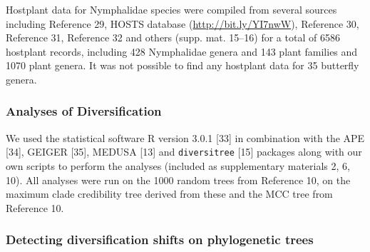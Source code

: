 \documentclass[10pt]{article}
\begin{document}
Hostplant data for Nymphalidae species were compiled from several
sources including Reference 29, HOSTS database
(\url{http://bit.ly/YI7nwW}), Reference 30, Reference 31, Reference 32
and others (supp. mat. 15--16) for a total of 6586 hostplant records,
including 428 Nymphalidae genera and 143 plant families and 1070 plant
genera. It was not possible to find any hostplant data for 35 butterfly
genera.

\subsubsection{Analyses of
Diversification}\label{analyses-of-diversification}

We used the statistical software R version 3.0.1 {[}33{]} in combination
with the APE {[}34{]}, GEIGER {[}35{]}, MEDUSA {[}13{]} and
\texttt{diversitree} {[}15{]} packages along with our own scripts to
perform the analyses (included as supplementary materials 2, 6, 10). All
analyses were run on the 1000 random trees from Reference 10, on the
maximum clade credibility tree derived from these and the MCC tree from
Reference 10.

\subsubsection{Detecting diversification shifts on phylogenetic
trees}\label{detecting-diversification-shifts-on-phylogenetic-trees}
\end{document}
